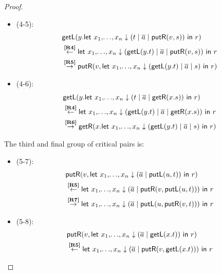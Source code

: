 \documentclass[twoside,11pt,final]{entics}
\newcommand{\getl}{\mathsf{getL}}
\newcommand{\putr}{\mathsf{putR}}
\newcommand{\getr}{\mathsf{getR}}
\newcommand{\putl}{\mathsf{putL}}
\newcommand{\from}{\leftarrow}
\newcommand{\asn}{\downarrow}
\newcommand{\seq}{,\!\ldots\!,}
\begin{document}
\begin{proof}
\begin{itemize}
\begin{align*}
    \end{align*}
  \item[] (4-5): \vspace{-2em}
    \begin{align*}
      & \getl(y.\textsf{let } x_1 \seq x_n \asn (t \mid \overline{a} \mid \putr(v,s)) \textsf{ in } r) 
      \\& \overset{\text{\bf[R4]}}{\from}\textsf{let } x_1 \seq x_n \asn (\getl(y.t) \mid \overline{a} \mid \putr(v,s)) \textsf{ in } r
      \\& \overset{\text{\bf[R5]}}{\to} \putr(v,\textsf{let } x_1 \seq x_n \asn (\getl(y.t) \mid \overline{a} \mid s) \textsf{ in } r) 
    \end{align*}
  \item[] (4-6): \vspace{-2em}
    \begin{align*}
      & \getl(y.\textsf{let } x_1 \seq x_n \asn (t \mid \overline{a} \mid \getr(x.s)) \textsf{ in } r)
      \\& \overset{\text{\bf[R4]}}{\from} \textsf{let } x_1 \seq x_n \asn (\getl(y.t) \mid \overline{a} \mid \getr(x.s)) \textsf{ in } r
      \\& \overset{\text{\bf[R6]}}{\to} \getr(x.\textsf{let } x_1 \seq x_n \asn (\getl(y.t) \mid \overline{a} \mid s) \textsf{ in } r) 
    \end{align*}
  \end{itemize}
  The third and final group of critical pairs is:
  \begin{itemize}
  \item[] (5-7): \vspace{-2em}
    \begin{align*}
      & \putr(v,\textsf{let } x_1 \seq x_n \asn (\overline{a} \mid \putl(u,t)) \textsf{ in } r) 
      \\& \overset{\text{\bf[R5]}}{\from} \textsf{let } x_1 \seq x_n \asn (\overline{a} \mid \putr(v,\putl(u,t))) \textsf{ in } r
      \\& \overset{\text{\bf[R7]}}{\to} \textsf{let } x_1 \seq x_n \asn (\overline{a} \mid \putl(u,\putr(v,t))) \textsf{ in } r 
    \end{align*}
  \item[] (5-8): \vspace{-2em}
    \begin{align*}
      & \putr(v,\textsf{let } x_1 \seq x_n \asn (\overline{a} \mid \getl(x.t)) \textsf{ in } r) 
      \\& \overset{\text{\bf[R5]}}{\from} \textsf{let } x_1 \seq x_n \asn (\overline{a} \mid \putr(v,\getl(x.t))) \textsf{ in } r 

\end{align*}
\end{itemize}
\end{proof}
\end{document}
